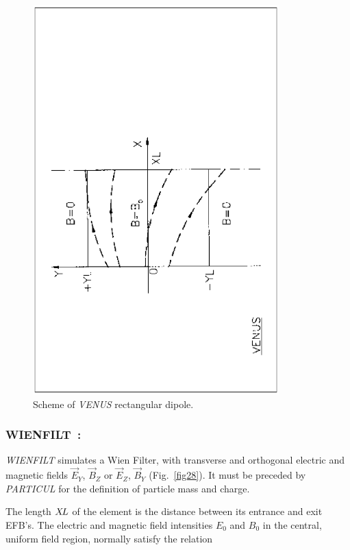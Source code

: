\vfill
\begin{figure}[H]
\centerline{\includegraphics[height=15cm,angle=-90]{Fig32.ps}}
\caption{\label{fig32}Scheme of \textsl{VENUS} rectangular dipole.}
\end{figure}
\vfill

\newpage

\subsubsection*{WIENFILT~: \WIENFILTTitl}\label{WIENFILT} 

\textsl{WIENFILT} simulates a Wien Filter, with transverse and
orthogonal electric and magnetic fields $ \vec  E_Y$,  $ \vec  B_Z $ or $ \vec  E_Z$, 
 $ \vec  B_Y$ (Fig.~\ref{fig28}).
 It must be preceded by \textsl{PARTICUL} for the definition of particle mass and charge.  
\bigskip

\noindent The length $ X\!L $ of the element is the distance between its
entrance and exit EFB's. The electric and magnetic field intensities $ E_0 $ and $ B_0 $ in the 
central, uniform field region, normally satisfy the relation
 
